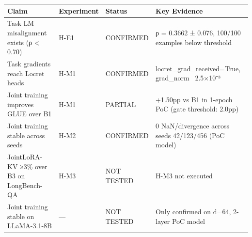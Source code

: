 \begin{table}[htbp]
\centering
\begin{tabular}{llll}
\toprule
Claim & Experiment & Status & Key Evidence \\
\midrule
Task-LM misalignment exists (ρ < 0.70) & H-E1 & CONFIRMED & ρ = 0.3662 ± 0.076, 100/100 examples below threshold \\
Task gradients reach Locret heads & H-M1 & CONFIRMED & locret_grad_received=True, grad_norm ~2.5×10⁻³ \\
Joint training improves GLUE over B1 & H-M1 & PARTIAL & +1.50pp vs B1 in 1-epoch PoC (gate threshold: 2.0pp) \\
Joint training stable across seeds & H-M2 & CONFIRMED & 0 NaN/divergence across seeds 42/123/456 (PoC model) \\
JointLoRA-KV ≥3\% over B3 on LongBench-QA & H-M3 & NOT TESTED & H-M3 not executed \\
Joint training stable on LLaMA-3.1-8B & — & NOT TESTED & Only confirmed on d=64, 2-layer PoC model \\
\bottomrule
\end{tabular}
\end{table}

